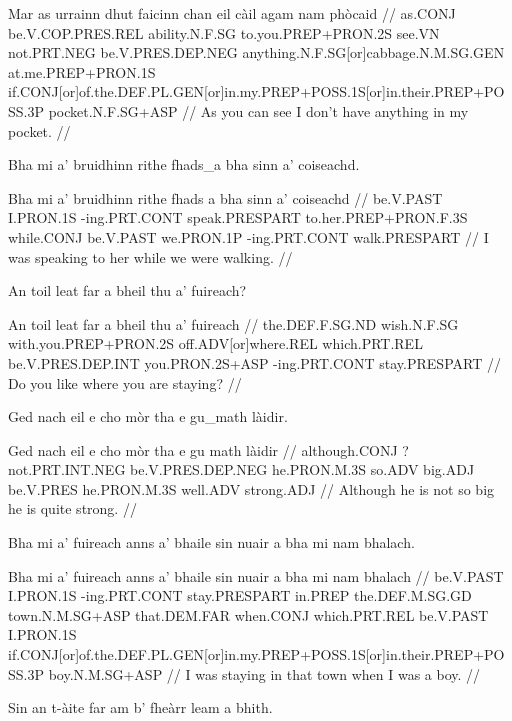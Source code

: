 \documentclass[a4paper,10pt]{article}
\begin{document}
\vspace{4mm}
\gla Mar as urrainn dhut faicinn chan eil càil agam nam phòcaid  //
\glb as.CONJ be.V.COP.PRES.REL ability.N.F.SG to.you.PREP+PRON.2S see.VN not.PRT.NEG be.V.PRES.DEP.NEG anything.N.F.SG[or]cabbage.N.M.SG.GEN at.me.PREP+PRON.1S if.CONJ[or]of.the.DEF.PL.GEN[or]in.my.PREP+POSS.1S[or]in.their.PREP+POSS.3P pocket.N.F.SG+ASP  //
\glft As you can see I don't have anything in my pocket. //
\endgl
\xe

\ex
\begingl
\glpre Bha mi a' bruidhinn rithe fhads\_a bha sinn a' coiseachd. 

\vspace{4mm}
\gla Bha mi a' bruidhinn rithe {fhads a} bha sinn a' coiseachd  //
\glb be.V.PAST I.PRON.1S -ing.PRT.CONT speak.PRESPART to.her.PREP+PRON.F.3S while.CONJ be.V.PAST we.PRON.1P -ing.PRT.CONT walk.PRESPART  //
\glft I was speaking to her while we were walking. //
\endgl
\xe

\ex
\begingl
\glpre An toil leat far a bheil thu a' fuireach? 

\vspace{4mm}
\gla An toil leat far a bheil thu a' fuireach  //
\glb the.DEF.F.SG.ND wish.N.F.SG with.you.PREP+PRON.2S off.ADV[or]where.REL which.PRT.REL be.V.PRES.DEP.INT you.PRON.2S+ASP -ing.PRT.CONT stay.PRESPART  //
\glft Do you like where you are staying? //
\endgl
\xe

\ex
\begingl
\glpre Ged nach eil e cho mòr tha e gu\_math làidir. 

\vspace{4mm}
\gla Ged nach eil e cho mòr tha e {gu math} làidir  //
\glb although.CONJ ?not.PRT.INT.NEG be.V.PRES.DEP.NEG he.PRON.M.3S so.ADV big.ADJ be.V.PRES he.PRON.M.3S well.ADV strong.ADJ  //
\glft Although he is not so big he is quite strong. //
\endgl
\xe

\ex
\begingl
\glpre Bha mi a' fuireach anns a' bhaile sin nuair a bha mi nam bhalach. 

\vspace{4mm}
\gla Bha mi a' fuireach anns a' bhaile sin nuair a bha mi nam bhalach  //
\glb be.V.PAST I.PRON.1S -ing.PRT.CONT stay.PRESPART in.PREP the.DEF.M.SG.GD town.N.M.SG+ASP that.DEM.FAR when.CONJ which.PRT.REL be.V.PAST I.PRON.1S if.CONJ[or]of.the.DEF.PL.GEN[or]in.my.PREP+POSS.1S[or]in.their.PREP+POSS.3P boy.N.M.SG+ASP  //
\glft I was staying in that town when I was a boy. //
\endgl
\xe

\ex
\begingl
\glpre Sin an t-àite far am b' fheàrr leam a bhith. 
\end{document}
